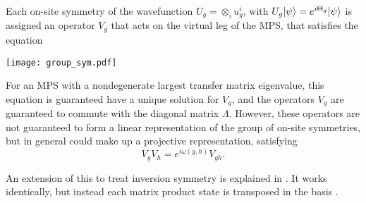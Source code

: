 Each on-site symmetry of the wavefunction $U_g = \otimes_i u^i_g$, with $U_g 
\vert \psi \rangle = e^{i \Theta_g} \vert \psi \rangle$ is assigned an operator $V_g$ that 
acts on the virtual leg of the MPS, that satisfies the equation
\begin{center}
\texttt{[image: group\_sym.pdf]}
\end{center}

For an MPS with a nondegenerate largest 
transfer matrix eigenvalue, this equation is guaranteed have a unique solution 
for $V_g$, and the operators $V_g$ are guaranteed to commute with the diagonal 
matrix $\Lambda$. However, these operators are not guaranteed to form a linear 
representation of the group of on-site symmetries, but in general could make 
up a projective representation, satisfying 
$$V_g V_h = e^{i \omega(g, h)} V_{gh}.$$



    




An extension of this to treat inversion symmetry is explained in 
. It works identically, but instead each matrix 
product state is transposed in the basis .




